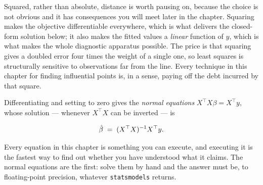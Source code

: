 \documentclass[
  letterpaper,
  10pt,
  twoside,
  openright,
  numbers=noenddot,
  chapterprefix=true]{scrbook}
\begin{document}
Squared, rather than absolute, distance is worth pausing on, because the
choice is not obvious and it has consequences you will meet later in the
chapter. Squaring makes the objective differentiable everywhere, which
is what delivers the closed-form solution below; it also makes the
fitted values a \emph{linear} function of \(y\), which is what makes the
whole diagnostic apparatus possible. The price is that squaring gives a
doubled error four times the weight of a single one, so least squares is
structurally sensitive to observations far from the line. Every
technique in this chapter for finding influential points is, in a sense,
paying off the debt incurred by that square.

Differentiating and setting to zero gives the \emph{normal equations}
\(X^{\top}X\beta = X^{\top}y\), whose solution --- whenever
\(X^{\top}X\) can be inverted --- is

\[
\hat\beta \thickspace=\thickspace (X^{\top}X)^{-1} X^{\top} y .
\]

Every equation in this chapter is something you can execute, and
executing it is the fastest way to find out whether you have understood
what it claims. The normal equations are the first: solve them by hand
and the answer must be, to floating-point precision, whatever
\texttt{statsmodels} returns.
\end{document}

